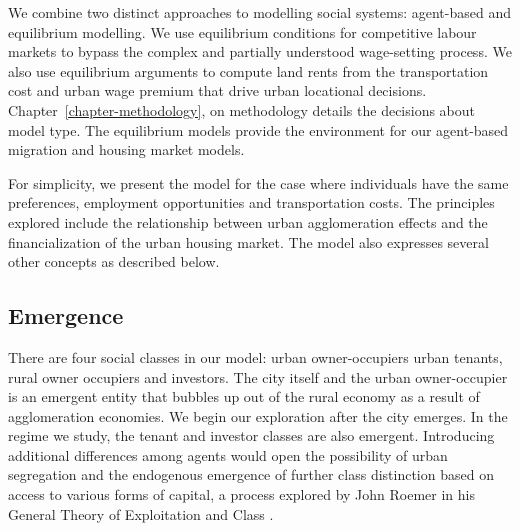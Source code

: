 

We combine two distinct approaches to modelling social systems: agent-based and equilibrium modelling.  We use equilibrium conditions for competitive labour markets to bypass the complex and partially understood wage-setting process. We also use equilibrium arguments to compute land rents from the transportation cost and urban wage premium that drive urban locational decisions. Chapter~\ref{chapter-methodology}, on methodology details the decisions about model type. The equilibrium models provide the environment for  our   agent-based migration and  housing market models.

For simplicity, we present the model for the case where individuals have the same preferences, employment opportunities and transportation costs. The principles explored include the relationship between urban agglomeration effects and the financialization of the urban housing market. The model also expresses several other concepts as described below.

\subsection{Emergence}



There are four social classes in our model: urban owner-occupiers  urban tenants, rural owner occupiers and investors. The city itself and the urban owner-occupier is an emergent entity that bubbles up out of the rural economy as a result of agglomeration economies. We begin our exploration after the city emerges. In the regime we study, the tenant and investor classes are also emergent. Introducing additional differences among agents would open the possibility of urban segregation and the endogenous emergence of further \gls{class} distinction based on  access to various forms of capital, a process explored by John Roemer in his General Theory of Exploitation and Class \cite{roemerGeneralTheoryExploitation1982}.

